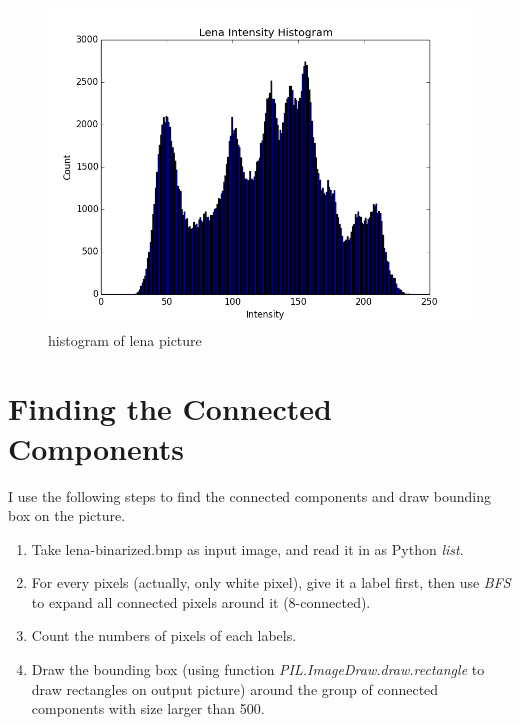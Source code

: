 \documentclass[12pt,twoside,a4paper]{article}
\begin{document}
\begin{figure}[H]
\centering
\includegraphics[scale=0.5]{lena-histogram.png}
\caption{histogram of lena picture}
\label{fig:lena-histogram.png}
\end{figure}

\section{Finding the Connected Components}
I use the following steps to find the connected components and draw bounding box on the picture.
\begin{enumerate}
	\item Take lena-binarized.bmp as input image, and read it in as Python \textit{list}.
	\item For every pixels (actually, only white pixel), give it a label first, then use \textit{BFS} to expand all connected pixels around it (8-connected).
	\item Count the numbers of pixels of each labels.
	\item Draw the bounding box (using function \textit{PIL.ImageDraw.draw.rectangle} to draw rectangles on output picture) around the group of connected components with size larger than 500.
\end{enumerate}
\end{document}
